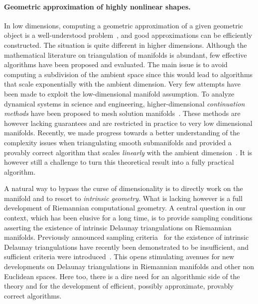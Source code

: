 \paragraph{Geometric approximation of highly nonlinear shapes.}
In low dimensions, computing a geometric approximation of a given geometric
object is a well-understood problem~\cite{geometrica-ecg-book,dey-csr-2007}, and good approximations can be
efficiently constructed.
The situation is quite different in higher dimensions.  Although the
mathematical literature on triangulation of manifolds is abundant, few
effective algorithms have been proposed and evaluated.  The main issue is
to avoid computing a subdivision of the ambient space since this would lead to algorithms that scale exponentially with the ambient dimension. Very few attempts have been made to exploit the  low-dimensional manifold assumption.
To analyze {dynamical systems} in science and engineering, higher-dimensional {\em continuation methods} have been proposed to mesh solution manifolds~\cite{mh-mpc-2002}. These methods are however lacking guarantees and are restricted in practice to very low dimensional manifolds. 
Recently, we made progress towards a better understanding of the complexity issues when triangulating smooth submanifolds and provided a provably correct algorithm that scales {\em linearly} with the ambient dimension~\cite{boissonnat2010meshing}. 
It is however still a challenge to turn this theoretical result into a fully practical algorithm.

A natural way to bypass the curse of dimensionality is to directly work on the manifold and to resort to {\em intrinsic geometry}. What is lacking however is a full development of Riemannian computational geometry. A central question in our context, which has been elusive for a long time, is to provide sampling conditions asserting the existence of intrinsic Delaunay triangulations on Riemannian manifolds. Previously announced sampling criteria~\cite{leibon2000} for the existence of intrinsic Delaunay triangulations have recently been demonstrated to be insufficient, and sufficient criteria were introduced~\cite{boissonnat2012stab}. This opens stimulating avenues for new developments on Delaunay triangulations in Riemannian manifolds and other non Euclidean spaces. Here too, there is a dire need for an algorithmic side of the theory and for the development of efficient, possibly approximate, provably correct algorithms.  %


